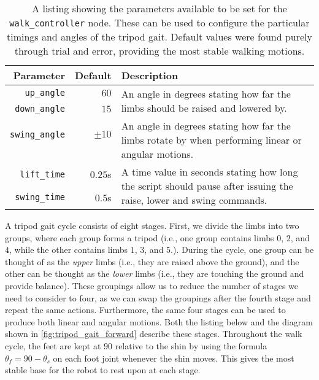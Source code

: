 \begin{table}[h!]
	\centering
	\begin{tabular}{ r r p{10cm} }
		\toprule
		\textbf{Parameter} & 
		\textbf{Default} & 
		\textbf{Description} \\
		\midrule

		\texttt{up\_angle} & 
		$60$\textdegree{} & 
		\multirow{2}{10cm}{An angle in degrees stating how far the limbs should be raised and lowered by.} \\

		\texttt{down\_angle} & 
		$15$\textdegree{} & \\

		\hline

		\texttt{swing\_angle} & 
		$\pm10$\textdegree{} & 
		\multirow{2}{10cm}{An angle in degrees stating how far the limbs rotate by when performing linear or angular motions.} \\

		& & \\
		
		\hline

		\texttt{lift\_time} & 
		$0.25$s & 
		\multirow{2}{10cm}{A time value in seconds stating how long the script should pause after issuing the raise, lower and swing commands.} \\

		\texttt{swing\_time} & 
		$0.5$s & 
		\\
		\bottomrule
	\end{tabular}
	\caption{A listing showing the parameters available to be set for the \texttt{walk\_controller} node. These can be used to configure the particular timings and angles of the tripod gait. Default values were found purely through trial and error, providing the most stable walking motions.}
	\label{tab:walker_params}
\end{table}

A tripod gait cycle consists of eight stages. First, we divide the limbs into two groups, where each group forms a tripod (i.e., one group contains limbs $0$, $2$, and $4$, while the other contains limbs $1$, $3$, and $5$.). During the cycle, one group can be thought of as the \emph{upper} limbs (i.e., they are raised above the ground), and the other can be thought as the \emph{lower} limbs (i.e., they are touching the ground and provide balance). These groupings allow us to reduce the number of stages we need to consider to four, as we can swap the groupings after the fourth stage and repeat the same actions. Furthermore, the same four stages can be used to produce both linear and angular motions. Both the listing below and the diagram shown in \autoref{fig:tripod_gait_forward} describe these stages. Throughout the walk cycle, the feet are kept at $90$\textdegree{} relative to the shin by using the formula $\theta_f = 90 - \theta_s$ on each foot joint whenever the shin moves. This gives the most stable base for the robot to rest upon at each stage.

